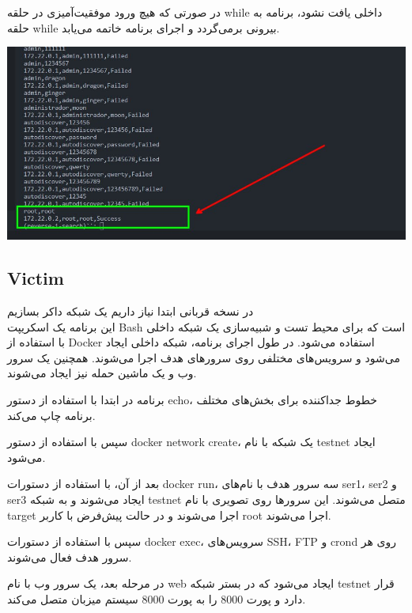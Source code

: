 \documentclass[oneside]{report}
\begin{document}
در صورتی که هیچ ورود موفقیت‌آمیزی در حلقه while داخلی یافت نشود، برنامه به حلقه while بیرونی برمی‌گردد و اجرای برنامه خاتمه می‌یابد.
\begin{center}
    \includegraphics[height=0.5\linewidth]{finding_password.png}
\end{center}

\subsection*{Victim}
در نسخه قربانی ابتدا نیاز داریم یک شبکه داکر بسازیم
\\
این برنامه یک اسکریپت Bash است که برای محیط تست و شبیه‌سازی یک شبکه داخلی با استفاده از Docker استفاده می‌شود. در طول اجرای برنامه، شبکه داخلی ایجاد می‌شود و سرویس‌های مختلفی روی سرورهای هدف اجرا می‌شوند. همچنین یک سرور وب و یک ماشین حمله نیز ایجاد می‌شوند.

برنامه در ابتدا با استفاده از دستور echo، خطوط جداکننده برای بخش‌های مختلف برنامه چاپ می‌کند.

سپس با استفاده از دستور docker network create، یک شبکه با نام testnet ایجاد می‌شود.

بعد از آن، با استفاده از دستورات docker run، سه سرور هدف با نام‌های ser1، ser2 و ser3 ایجاد می‌شوند و به شبکه testnet متصل می‌شوند. این سرورها روی تصویری با نام target اجرا می‌شوند و در حالت پیش‌فرض با کاربر root اجرا می‌شوند.

سپس با استفاده از دستورات docker exec، سرویس‌های SSH، FTP و crond روی هر سرور هدف فعال می‌شوند.

در مرحله بعد، یک سرور وب با نام web ایجاد می‌شود که در بستر شبکه testnet قرار دارد و پورت 8000 را به پورت 8000 سیستم میزبان متصل می‌کند.
\end{document}
